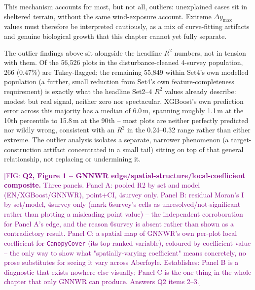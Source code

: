 \documentclass[logo,msc,ai]{infthesis}           %
\newcommand{\fig}[1]{\textcolor{purple}{[FIG: #1]}}
\begin{document}
This mechanism accounts for most, but not all, outliers: unexplained cases sit in sheltered terrain, without the same wind-exposure account. Extreme $\Delta y_{\max}$ values must therefore be interpreted cautiously, as a mix of curve-fitting artifacts and genuine biological growth that this chapter cannot yet fully separate.

The outlier findings above sit alongside the headline $R^2$ numbers, not in tension with them. Of the 56,526 plots in the disturbance-cleaned 4-survey population, 266 (0.47\%) are Tukey-flagged; the remaining 55,849 within Set4's own modelled population (a further, small reduction from Set4's own feature-completeness requirement) is exactly what the headline Set2--4 $R^2$ values already describe: modest but real signal, neither zero nor spectacular. XGBoost's own prediction error across this majority has a median of 6.0\,m, spanning roughly 1.1\,m at the 10th percentile to 15.8\,m at the 90th -- most plots are neither perfectly predicted nor wildly wrong, consistent with an $R^2$ in the 0.24--0.32 range rather than either extreme. The outlier analysis isolates a separate, narrower phenomenon (a target-construction artifact concentrated in a small tail) sitting on top of that general relationship, not replacing or undermining it.


\fig{\textbf{Q2, Figure 1 -- GNNWR edge/spatial-structure/local-coefficient
composite.} Three panels. Panel A: pooled R2 by set and model (EN/XGBoost/GNNWR),
point+CI, 4survey only. Panel B: residual Moran's I by set/model, 4survey only (mark
6survey's cells as unresolved/not-significant rather than plotting a misleading point
value) -- the independent corroboration for Panel A's edge, and the reason 6survey is
absent rather than shown as a contradictory result. Panel C: a spatial map of GNNWR's
own per-plot local
coefficient for \texttt{CanopyCover} (its top-ranked variable), coloured by
coefficient value -- the only way to show what "spatially-varying coefficient" means
concretely, no prose substitutes for seeing it vary across Aberfoyle. Establishes:
Panel B is a diagnostic that exists nowhere else visually; Panel C is the one thing in
the whole chapter that only GNNWR can produce. Answers Q2 items 2--3.}
\end{document}
